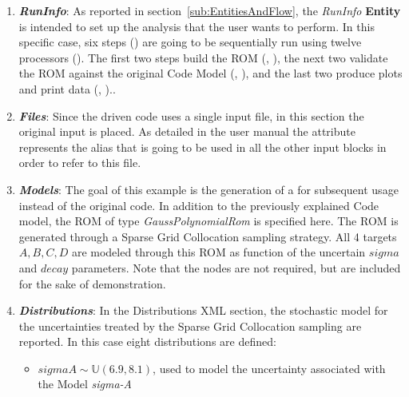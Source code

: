 \begin{enumerate}
   \item \textbf{\textit{RunInfo}}:
   As reported in section~\ref{sub:EntitiesAndFlow}, the \textit{RunInfo} \textbf{Entity} is intended to set up the analysis
   that the user wants to perform. In this specific case, six steps () are going to be sequentially run
   using twelve processors ().  The first two steps build the ROM
   (, ), the next two validate
   the ROM against the original Code Model (, ),
   and the last two produce plots and print data (, )..
   \item \textbf{\textit{Files}}:
   Since the driven code uses a single input file, in this section the original input is placed. As detailed in the user manual
   the attribute   represents the alias that is going to be used in all the other input blocks in order to refer to this file.
   \item \textbf{\textit{Models}}:
 The goal of this example is the generation of a 
 for subsequent usage instead of the original code.  In addition to the previously explained Code model,
 the ROM of type \textit{GaussPolynomialRom} is specified here. The ROM is generated through a Sparse Grid
 Collocation sampling strategy. All 4 targets $A,B,C,D$ are modeled through this ROM as function
 of the uncertain $sigma$ and $decay$ parameters.  Note that the  nodes are not
 required, but are included for the sake of demonstration.
   \item \textbf{\textit{Distributions}}:
  In the Distributions XML section, the stochastic model for the
  uncertainties  treated by the Sparse Grid Collocation sampling are reported. In
  this case eight distributions are defined:
  \begin{itemize}
    \item $sigmaA \sim \mathbb{U}(6.9,8.1)$, used to model the uncertainty
    associated with  the Model \textit{sigma-A}

\end{itemize}
\end{enumerate}
